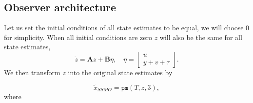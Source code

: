 \subsection{Observer architecture}
Let us set the initial conditions of all state estimates to be equal, we will choose $0$ for simplicity. When all initial conditions are zero $z$ will also be the same for all state estimates, 
\begin{equation*}
    \dot{z} = \mathbf{A}z + \mathbf{B}\eta, \quad \eta = 
    \begin{bmatrix}
        u \\ y + v + \tau
    \end{bmatrix}.
\end{equation*}
We then transform $z$ into the original state estimates by

\begin{equation*}
    \tilde{x}_{SSMO} = \texttt{pm}(T,z,3),
\end{equation*}
where
